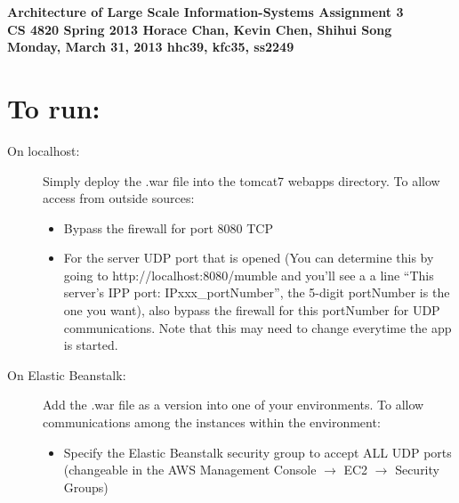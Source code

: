 \documentclass{article}
\begin{document}
\begin{framed}
  \large{\textbf{Architecture of Large Scale Information-Systems  \hfill Assignment 3\\
      CS 4820 Spring 2013 \hfill Horace Chan, Kevin Chen, Shihui Song \\
      Monday, March 31, 2013 \hfill hhc39, kfc35, ss2249
  }}
\end{framed}

\section{To run:}
  \begin{description}
    \item[On localhost:] Simply deploy the .war file into the tomcat7 webapps directory. To allow access from outside sources:
      \begin{itemize}
        \item Bypass the firewall for port 8080 TCP
        \item For the server UDP port that is opened (You can determine this by going to http://localhost:8080/mumble and you'll see a a line ``This server's IPP port: IPxxx\_portNumber'', the 5-digit portNumber is the one you want), also bypass the firewall for this portNumber for UDP communications. Note that this may need to change everytime the app is started.
      \end{itemize}
    \item[On Elastic Beanstalk:] Add the .war file as a version into one of your environments. To allow communications among the instances within the environment:
      \begin{itemize}
        \item Specify the Elastic Beanstalk security group to accept ALL UDP ports (changeable in the AWS Management Console $\to$ EC2 $\to$ Security Groups)
      \end{itemize}
  \end{description}
\end{document}
